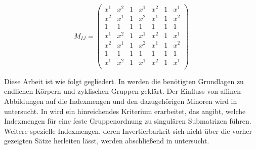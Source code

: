 \begin{equation*}
    M_{IJ} = \left( \begin{array}{cc|ccc|cc}
        x^1     & x^{2} & 1     & x^{1} & x^{2} & 1 & x^{1} \\
        x^{2}   & x^{1} & 1     & x^{2} & x^{1} & 1 & x^{2} \\
        \hline
        1       & 1     & 1     & 1     & 1     & 1 & 1     \\
        x^{1}   & x^{2} & 1     & x^{1} & x^{2} & 1 & x^{1} \\
        x^{2}   & x^{1} & 1     & x^{2} & x^{1} & 1 & x^{2} \\
        \hline
        1       & 1     & 1     & 1     & 1     & 1 & 1     \\
        x^1     & x^2   & 1     & x^1   & x^2   & 1 & x^1   \\
    \end{array} \right)
\end{equation*}

Diese Arbeit ist wie folgt gegliedert. In  werden die benötigten Grundlagen zu endlichen Körpern und zyklischen Gruppen geklärt. Der Einfluss von affinen Abbildungen auf die Indexmengen und den dazugehörigen Minoren wird in  untersucht. In  wird ein hinreichendes Kriterium erarbeitet, das angibt, welche Indexmengen für eine feste Gruppenordnung zu singulären Submatrizen führen. Weitere spezielle Indexmengen, deren Invertierbarkeit sich nicht über die vorher gezeigten Sätze herleiten lässt, werden abschließend in  untersucht.
